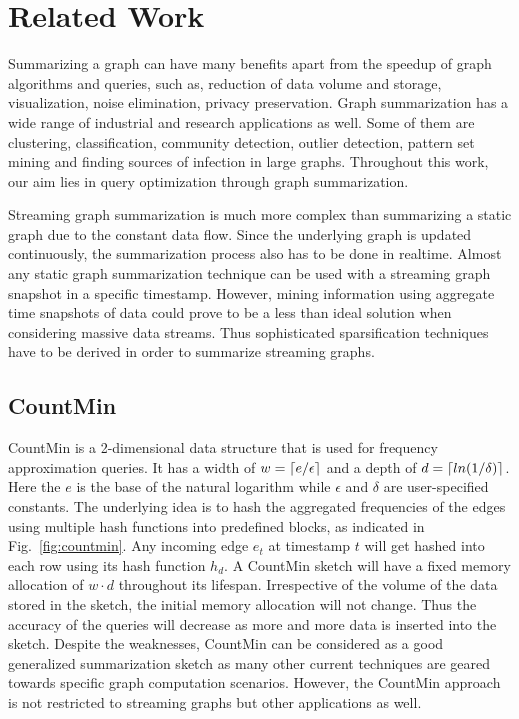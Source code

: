 \section{Related Work}
\label{sec:related_work}

Summarizing a graph can have many benefits\cite{liu_graph_2018} apart from the speedup of graph algorithms and queries, such as, reduction of data volume and storage\cite{seo_effective_2018}, visualization\cite{dunne_motif_2013, jin_eco_nodate}, noise elimination\cite{zhang_discovery-driven_2010}, privacy preservation\cite{shoaran_zero-knowledge_2013}. Graph summarization has a wide range of industrial and research applications as well. Some of them are clustering\cite{cilibrasi_clustering_2005}, classification\cite{hutchison_compression_2006}, community detection\cite{chakrabarti_fully_nodate}, outlier detection\cite{smets_odd_2011, akoglu_opavion_2012}, pattern set mining\cite{mampaey_tell_2011} and finding sources of infection in large graphs\cite{prakash_spotting_2012}. Throughout this work, our aim lies in query optimization through graph summarization.

Streaming graph summarization is much more complex than summarizing a static graph due to the constant data flow. Since the underlying graph is updated continuously, the summarization process also has to be done in realtime. Almost any static graph summarization technique can be used with a streaming graph snapshot in a specific timestamp. However, mining information using aggregate time snapshots of data could prove to be a less than ideal solution when considering massive data streams. Thus sophisticated sparsification techniques have to be derived in order to summarize streaming graphs. 

\subsection{CountMin}

CountMin\cite{cormode_improved_2003} is a 2-dimensional data structure that is used for frequency approximation queries. It has a width of \(w = \lceil e / \epsilon\rceil\) and a depth of \(d = \lceil ln(1 / \delta)\rceil\). Here the \(e\) is the base of the natural logarithm while \(\epsilon\) and \(\delta\) are user-specified constants. The underlying idea is to hash the aggregated frequencies of the edges using multiple hash functions into predefined blocks, as indicated in Fig.~\ref{fig:countmin}. Any incoming edge \(e_t\) at timestamp \(t\) will get hashed into each row using its hash function \(h_d\). A CountMin sketch will have a fixed memory allocation of \(w \cdot d\) throughout its lifespan. Irrespective of the volume of the data stored in the sketch, the initial memory allocation will not change. Thus the accuracy of the queries will decrease as more and more data is inserted into the sketch. Despite the weaknesses, CountMin can be considered as a good generalized summarization sketch as many other current techniques are geared towards specific graph computation scenarios. However, the CountMin approach is not restricted to streaming graphs but other applications as well\cite{cormode_improved_2003}. 

